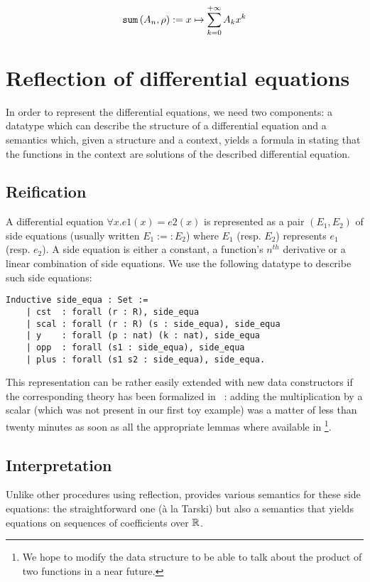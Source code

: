 \documentclass{article}
\begin{document}
$$\operatorname{\mathtt{sum}}{}(A_n, \rho) := x \mapsto \sum_{k=0}^{+ \infty} A_k x^k$$

\section{Reflection of differential equations}

In order to represent the differential equations, we need two components: a
datatype which can describe the structure of a differential equation and a
semantics which, given a structure and a context, yields a formula in
\Prop{} stating that the functions in the context are solutions of the
described differential equation.

\subsection{Reification}

A differential equation $\forall x. e1(x) = e2(x)$ is represented as a pair
$(E_1, E_2)$ of side equations (usually written $E_1 :=: E_2$) where $E_1$ (resp.
$E_2$) represents $e_1$ (resp. $e_2$). A side equation is either a constant,
a function's $n^{th}$ derivative or a linear combination of side equations. We
use the following datatype to describe such side equations:


\begin{verbatim}
Inductive side_equa : Set :=
    | cst  : forall (r : R), side_equa
    | scal : forall (r : R) (s : side_equa), side_equa
    | y    : forall (p : nat) (k : nat), side_equa
    | opp  : forall (s1 : side_equa), side_equa
    | plus : forall (s1 s2 : side_equa), side_equa.
\end{verbatim}

This representation can be rather easily extended with new data constructors if
the corresponding theory has been formalized in \coq{}~\cite{coq}: adding the multiplication
by a scalar (which was not present in our first toy example) was a matter of less
than twenty minutes as soon as all the appropriate lemmas where available in
\Rpser{}\footnote{We hope to modify the data structure to be able to talk about
the product of two functions in a near future.}.

\subsection{Interpretation}

Unlike other procedures using reflection, \dequa{} provides various semantics for
these side equations: the straightforward one (\`a la Tarski) but also a semantics
that yields equations on sequences of coefficients over $\mathbb{R}$.
\end{document}
